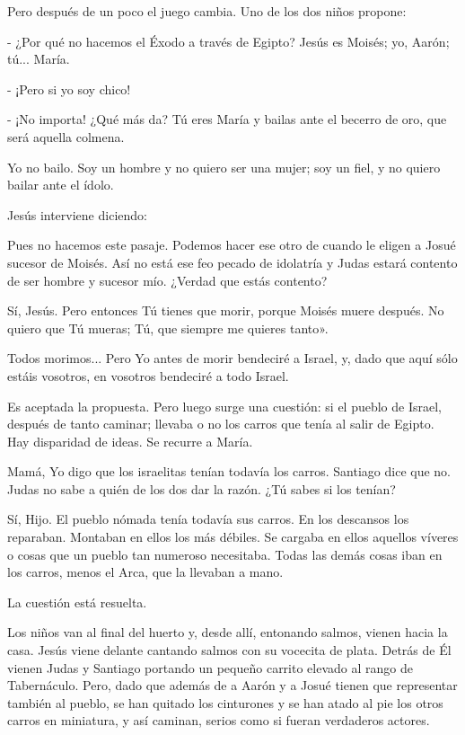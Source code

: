 \documentclass[12pt]{book} %
\begin{document}
Pero después de un poco el juego cambia. Uno de los dos niños propone: 

- ¿Por qué no hacemos el Éxodo a través de Egipto? Jesús es Moisés; yo, Aarón; tú... María. 

- ¡Pero si yo soy chico! 

- ¡No importa! ¿Qué más da? Tú eres María y bailas ante el becerro de oro, que será aquella colmena. 

Yo no bailo. Soy un hombre y no quiero ser una mujer; soy un fiel, y no quiero bailar ante el ídolo. 

Jesús interviene diciendo: 

Pues no hacemos este pasaje. Podemos hacer ese otro de cuando le eligen a Josué sucesor de Moisés. Así no está ese feo pecado de idolatría y Judas estará contento de ser hombre y sucesor mío. ¿Verdad que estás contento? 

Sí, Jesús. Pero entonces Tú tienes que morir, porque Moisés muere después. No quiero que Tú mueras; Tú, que siempre me quieres tanto». 

Todos morimos... Pero Yo antes de morir bendeciré a Israel, y, dado que aquí sólo estáis vosotros, en vosotros bendeciré a todo Israel. 

Es aceptada la propuesta. Pero luego surge una cuestión: si el pueblo de Israel, después de tanto caminar; llevaba o no los carros que tenía al salir de Egipto. Hay disparidad de ideas. Se recurre a María. 

Mamá, Yo digo que los israelitas tenían todavía los carros. Santiago dice que no. Judas no sabe a quién de los dos dar la razón. ¿Tú sabes si los tenían? 

Sí, Hijo. El pueblo nómada tenía todavía sus carros. En los descansos los reparaban. Montaban en ellos los más débiles. Se cargaba en ellos aquellos víveres o cosas que un pueblo tan numeroso necesitaba. Todas las demás cosas iban en los carros, menos el Arca, que la llevaban a mano. 

La cuestión está resuelta. 

Los niños van al final del huerto y, desde allí, entonando salmos, vienen hacia la casa. Jesús viene delante cantando salmos con su vocecita de plata. Detrás de Él vienen Judas y Santiago portando un pequeño carrito elevado al rango de Tabernáculo. Pero, dado que además de a Aarón y a Josué tienen que representar también al pueblo, se han quitado los cinturones y se han atado al pie los otros carros en miniatura, y así caminan, serios como si fueran verdaderos actores. 
\end{document}
